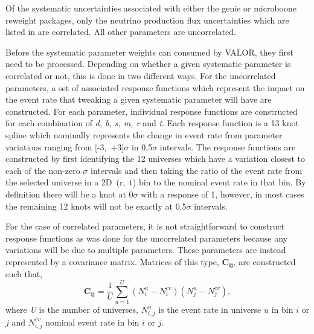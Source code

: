 Of the systematic uncertainties associated with either the \gls{genie} or \gls{microboone} reweight packages, only the neutrino production flux uncertainties which are listed in  are correlated. All other parameters are uncorrelated. 

Before the systematic parameter weights can consumed by VALOR, they first need to be processed. Depending on whether a given systematic parameter is correlated or not, this is done in two different ways. For the uncorrelated parameters, a set of associated response functions which represent the impact on the event rate that tweaking a given systematic parameter will have are constructed. For each parameter, individual response functions are constructed for each combination of \textit{d, b, s, m, r} and \textit{t}. Each response function is a 13 knot spline which nominally represents the change in event rate from parameter variations ranging from \mbox{[-3, +3]$\sigma$} in 0.5$\sigma$ intervals. The response functions are constructed by first identifying the 12 universes which have a variation closest to each of the non-zero $\sigma$ intervals and then taking the ratio of the event rate from the selected universe in a \mbox{2D (r, t)} bin to the nominal event rate in that bin. By definition there will be a knot at 0$\sigma$ with a response of 1, however, in most cases the remaining 12 knots will not be exactly at 0.5$\sigma$ intervals. 

For the case of correlated parameters, it is not straightforward to construct response functions as was done for the uncorrelated parameters because any variations will be due to multiple parameters. These parameters are instead represented by a covariance matrix. Matrices of this type, $\mathbf{C_{ij}}$, are constructed such that,
\begin{equation}
  \mathbf{C_{ij}} = \frac{1}{U} \sum_{u=1}^{U} (N_{i}^{u}-N_{i}^{cv})(N_{j}^{u}-N_{j}^{cv}),
  \label{eq:covmatrix}
\end{equation}
where \textit{U} is the number of universes, $N_{i,j}^{u}$ is the event rate in universe $u$ in bin $i$ or $j$ and $N_{i,j}^{cv}$ nominal event rate in
bin $i$ or $j$.

